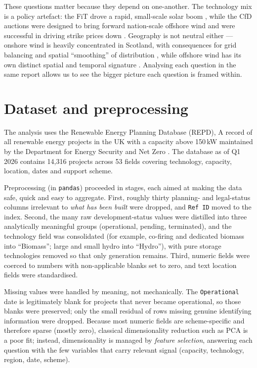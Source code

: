 \documentclass[11pt]{article}
\begin{document}
These questions matter because they depend on one-another. The technology mix is a policy artefact: the FiT drove a rapid, small-scale solar boom \citep{cherrington2013}, while the CfD auctions were designed to bring forward nation-scale offshore wind and were successful in driving strike prices down \citep{welisch2020}. Geography is not neutral either --- onshore wind is heavily concentrated in Scotland, with consequences for grid balancing and spatial ``smoothing'' of distribution \citep{commin2017}, while offshore wind has its own distinct spatial and temporal signature \citep{potisomporn2022}. Analysing each question in the same report allows us to see the bigger picture each question is framed within.

\section{Dataset and preprocessing}

The analysis uses the Renewable Energy Planning Database (REPD), A record of all renewable energy projects in the UK with a capacity above 150\,kW maintained by the Department for Energy Security and Net Zero \citep{repd2026}. The database as of Q1 2026 contains 14,316 projects across 53 fields covering technology, capacity, location, dates and support scheme.

Preprocessing (in \texttt{pandas}) proceeded in stages, each aimed at making the data safe, quick and easy to aggregate. First, roughly thirty planning- and legal-status columns irrelevant to \emph{what has been built} were dropped, and \texttt{Ref ID} moved to the index. Second, the many raw development-status values were distilled into three analytically meaningful groups (operational, pending, terminated), and the technology field was consolidated (for example, co-firing and dedicated biomass into ``Biomass''; large and small hydro into ``Hydro''), with pure storage technologies removed so that only generation remains. Third, numeric fields were coerced to numbers with non-applicable blanks set to zero, and text location fields were standardised.

Missing values were handled by meaning, not mechanically. The \texttt{Operational} date is legitimately blank for projects that never became operational, so those blanks were preserved; only the small residual of rows missing genuine identifying information were dropped. Because most numeric fields are scheme-specific and therefore sparse (mostly zero), classical dimensionality reduction such as PCA is a poor fit; instead, dimensionality is managed by \emph{feature selection}, answering each question with the few variables that carry relevant signal (capacity, technology, region, date, scheme).
\end{document}
